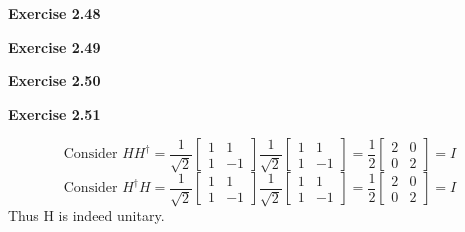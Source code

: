 \documentclass{article}
\begin{document}
\bigskip

\begin{framed}
    \noindent \textbf{Exercise 2.48}
    
    \medskip
    
    
\end{framed}

\bigskip

\begin{framed}
    \noindent \textbf{Exercise 2.49}
    
    \medskip
    
    
\end{framed}

\bigskip

\begin{framed}
    \noindent \textbf{Exercise 2.50}
    
    \medskip
    
    
\end{framed}

\bigskip

\begin{framed}
    \noindent \textbf{Exercise 2.51}
    
    \medskip
    $$
    \text{Consider } HH^{\dagger} = \frac{1}{\sqrt{2}}\begin{bmatrix}1 & 1\\ 1 & -1\end{bmatrix}\frac{1}{\sqrt{2}}\begin{bmatrix}1 & 1\\ 1 & -1\end{bmatrix}=\frac{1}{2}\begin{bmatrix}2 & 0 \\ 0 & 2\end{bmatrix}=I
    $$
    $$
    \text{Consider }H^{\dagger}H = \frac{1}{\sqrt{2}}\begin{bmatrix}1 & 1\\ 1 & -1\end{bmatrix}\frac{1}{\sqrt{2}}\begin{bmatrix}1 & 1\\ 1 & -1\end{bmatrix}=\frac{1}{2}\begin{bmatrix}2 & 0 \\ 0 & 2\end{bmatrix}=I
    $$
    Thus H is indeed unitary.
\end{framed}

\bigskip
\end{document}

